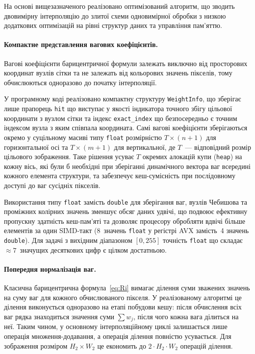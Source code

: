 На основі вищезазначеного реалізовано оптимізований алгоритм, що зводить двовимірну інтерполяцію до
злитої схеми одновимірної обробки з низкою додаткових оптимізацій
на рівні структур даних та управління пам'яттю.

\paragraph{Компактне представлення вагових коефіцієнтів.}
Вагові коефіцієнти барицентричної формули залежать виключно від
просторових координат вузлів сітки та не залежать від кольорових значень
пікселів, тому обчислюються одноразово до початку інтерполяції.

У програмному коді реалізовано компактну структуру \texttt{WeightInfo},
що зберігає лише прапорець \texttt{hit} що виступає у якості індикатора точного збігу цільової
координати з вузлом сітки та індекс \texttt{exact\_index} що безпосередньо є точним індексом вузла з яким співпала координата. Самі вагові
коефіцієнти зберігаються окремо у суцільному масиві типу
\texttt{float} розмірністю $T \times (n+1)$ для горизонтальної осі та
$T \times (m+1)$ для вертикальної, де $T$~--- відповідний розмір
цільового зображення. Таке рішення усуває $T$ окремих алокацій купи
(\texttt{heap}) на кожну вісь, які були б необхідні при зберіганні
динамічного вектора ваг всередині кожного елемента структури, та
забезпечує кеш-сумісність при послідовному доступі до ваг сусідніх
пікселів.

Використання типу \texttt{float} замість \texttt{double} для зберігання
ваг, вузлів Чебишова та проміжних колірних значень зменшує обсяг даних
удвічі, що подвоює ефективну пропускну здатність кеш-пам'яті та
дозволяє процесору обробляти вдвічі більше елементів за один SIMD-такт
(8~значень \texttt{float} у регістрі AVX замість~4 значень
\texttt{double}). Для задачі з вихідним діапазоном $[0, 255]$ точність
\texttt{float} що складає $\approx 7$~значущих десяткових цифр є цілком
достатньою.

\paragraph{Попередня нормалізація ваг.}
Класична барицентрична формула~\eqref{eq:Ri} вимагає ділення суми
зважених значень на суму ваг для кожного
обчислюваного пікселя. У реалізованому алгоритмі це ділення виконується
одноразово на етапі побудови кешу: після обчислення всіх ваг рядка
знаходиться значення суми $\sum w_j$, після
чого кожна вага ділиться на неї. Таким чином, у основному
інтерполяційному циклі залишається лише операція множення-додавання, а операція ділення повністю усувається. Для
зображення розміром $H_2 \times W_2$ це економить до $2 \cdot H_2 \cdot W_2$
операцій ділення.

